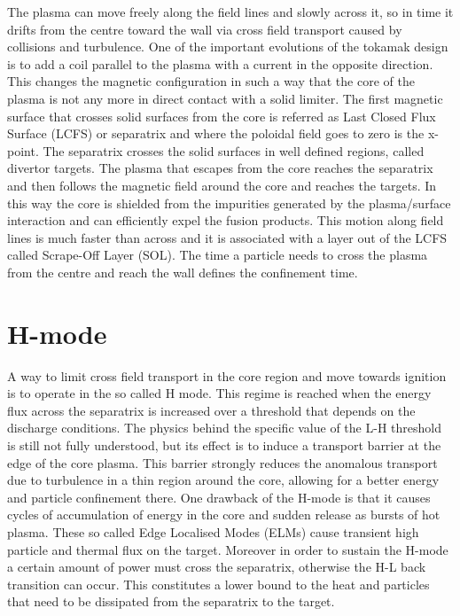 The plasma can move freely along the field lines and slowly across it, so in time it drifts from the centre toward the wall via cross field transport caused by collisions and turbulence. One of the important
evolutions of the tokamak design is to add a coil parallel to the plasma with a current in the opposite direction. This changes the magnetic configuration in such a way that the core of the plasma is not any more in direct contact with a solid limiter. The first magnetic surface that crosses solid surfaces from the core is referred as Last Closed Flux Surface (LCFS) or separatrix and where the poloidal field goes to zero is the x-point. The separatrix crosses the solid surfaces in well defined regions, called divertor targets. The plasma that escapes from the core reaches the separatrix and then follows the magnetic field around the core and reaches the targets. In this way the core is shielded from the impurities generated by the plasma/surface interaction and can efficiently expel the fusion products. This motion along field lines is much faster than across and it is associated with a layer out of the LCFS called Scrape-Off Layer (SOL). The time a particle needs to cross the plasma from the centre and reach the wall defines the confinement time.

\section{H-mode}
A way to limit cross field transport in the core region and move towards ignition is to operate in the so called H mode. This regime is reached when the energy flux across the separatrix is increased over a threshold that depends on the discharge conditions.\cite{Ryter1998} The physics behind the specific value of the L-H threshold is still not fully understood, but its effect is to induce a transport barrier at the edge of the core plasma. This barrier strongly reduces the anomalous transport due to turbulence in a thin region around the core, allowing for a better energy and particle confinement there. One drawback of the H-mode is that it causes cycles of accumulation of energy in the core and sudden release as bursts of hot plasma. These so called Edge Localised Modes (ELMs) cause transient high particle and thermal flux on the target. Moreover in order to sustain the H-mode a certain amount of power must cross the separatrix, otherwise the H-L back transition can occur. This constitutes a lower bound to the heat and particles that need to be dissipated from the separatrix to the target.


